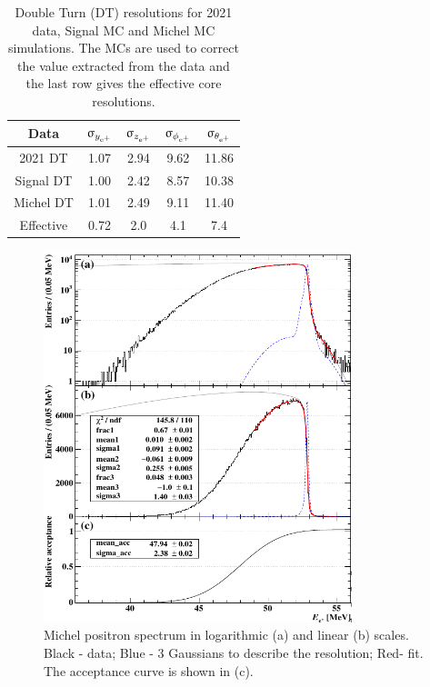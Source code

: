 \begin{refsection}
        \begin{table}
            \centering
            \begin{tabular}{ccccc}
                \hline
                Data & $\upsigma_{y_{\text{e}^+}}$ & $\upsigma_{z_{\text{e}^+}}$ & $\upsigma_{\phi_{\text{e}^+}}$ & $\upsigma_{\theta_{\text{e}^+}}$\\
                \hline
                \hline
                2021 DT& 1.07 & 2.94 & 9.62 & 11.86\\
                Signal DT& 1.00 & 2.42 & 8.57 & 10.38\\
                Michel DT& 1.01 & 2.49 & 9.11 & 11.40\\
                \hline
                Effective & 0.72 & 2.0 & 4.1 & 7.4\\
            \end{tabular}
            \caption[CDCH: resolutions]{Double Turn (DT) resolutions for 2021 data, Signal MC and Michel MC simulations. The MCs are used to correct the value extracted from the data and the last row gives the effective core resolutions.}
            \label{tab:CDCH:resolution}
        \end{table}

        \begin{figure}
            \centering
            \includegraphics[width = 0.8\textwidth]{Figures/MEG/CDCH_michelfit.png}
            \caption[CDCH: Michel fit]{Michel positron spectrum in logarithmic (a) and linear (b) scales. Black - data; Blue - 3 Gaussians to describe the resolution; Red- fit. The acceptance curve is shown in (c).}
            \label{fig:MEGII:CDCH:michel}
        \end{figure}


\end{refsection}
